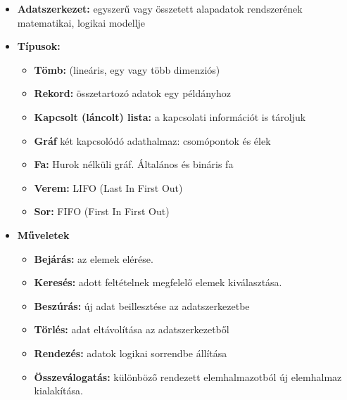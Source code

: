 \documentclass[11pt,a4paper]{article}
\begin{document}
            \begin{tcolorbox}[colback=blue!5!white,colframe=blue!50!black,title= 17. Ismertesse az alapvető adatszerkezet típusokat és ezek műveleteit!]
                \begin{itemize}
                    \item \textbf{Adatszerkezet:} egyszerű vagy összetett alapadatok rendszerének matematikai, logikai modellje
                    \item \textbf{Típusok:}
                    \begin{itemize}
                        \item \textbf{Tömb:} (lineáris, egy vagy több dimenziós)
                        \item \textbf{Rekord:} összetartozó adatok egy példányhoz
                        \item \textbf{Kapcsolt (láncolt) lista:} a kapcsolati információt is tároljuk
                        \item \textbf{Gráf} két kapcsolódó adathalmaz: csomópontok és élek
                        \item \textbf{Fa:} Hurok nélküli gráf. Általános és bináris fa
                        \item \textbf{Verem:} LIFO (Last In First Out)
                        \item \textbf{Sor:} FIFO (First In First Out)
                    \end{itemize}
                    \item \textbf{Műveletek}
                    \begin{itemize}
                        \item \textbf{Bejárás:} az elemek elérése.
                        \item \textbf{Keresés:} adott feltételnek megfelelő elemek kiválasztása.
                        \item \textbf{Beszúrás:} új adat beillesztése az adatszerkezetbe
                        \item \textbf{Törlés:} adat eltávolítása az adatszerkezetből
                        \item \textbf{Rendezés:} adatok logikai sorrendbe állítása
                        \item \textbf{Összeválogatás:} különböző rendezett elemhalmazotból új elemhalmaz kialakítása.
                    \end{itemize}
                \end{itemize}
            \end{tcolorbox}
            
\end{document}
